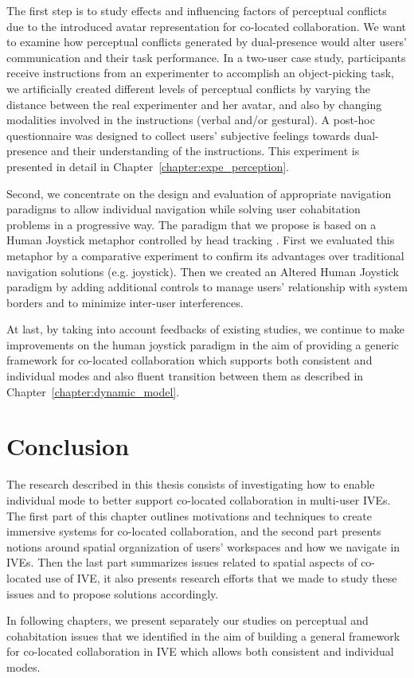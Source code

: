 The first step is to study effects and influencing factors of perceptual conflicts due to the introduced avatar representation for co-located collaboration. We want to examine how perceptual conflicts generated by dual-presence would alter users' communication and their task performance. In a two-user case study, participants receive instructions from an experimenter to accomplish an object-picking task, we artificially created different levels of perceptual conflicts by varying the distance between the real experimenter and her avatar, and also by changing modalities involved in the instructions (verbal and/or gestural). A post-hoc questionnaire was designed to collect users' subjective feelings towards dual-presence and their understanding of the instructions. This experiment is presented in detail in Chapter~\ref{chapter:expe_perception}.

Second, we concentrate on the design and evaluation of appropriate navigation paradigms to allow individual navigation while solving user cohabitation problems in a progressive way. The paradigm that we propose is based on a Human Joystick metaphor controlled by head tracking \citep{Bourdot2002HCNav}. First we evaluated this metaphor by a comparative experiment \citep{Chen2013NVW} to confirm its advantages over traditional navigation solutions (e.g. joystick). Then we created an Altered Human Joystick paradigm by adding additional controls to manage users' relationship with system borders and to minimize inter-user interferences.

At last, by taking into account feedbacks of existing studies, we continue to make improvements on the human joystick paradigm in the aim of providing a generic framework for co-located collaboration which supports both consistent and individual modes and also fluent transition between them as described in Chapter~\ref{chapter:dynamic_model}.


\section{Conclusion}
The research described in this thesis consists of investigating how to enable individual mode to better support co-located collaboration in multi-user IVEs. The first part of this chapter outlines motivations and techniques to create immersive systems for co-located collaboration, and the second part presents notions around spatial organization of users' workspaces and how we navigate in IVEs. Then the last part summarizes issues related to spatial aspects of co-located use of IVE, it also presents research efforts that we made to study these issues and to propose solutions accordingly.

In following chapters, we present separately our studies on perceptual and cohabitation issues that we identified in the aim of building a general framework for co-located collaboration in IVE which allows both consistent and individual modes.